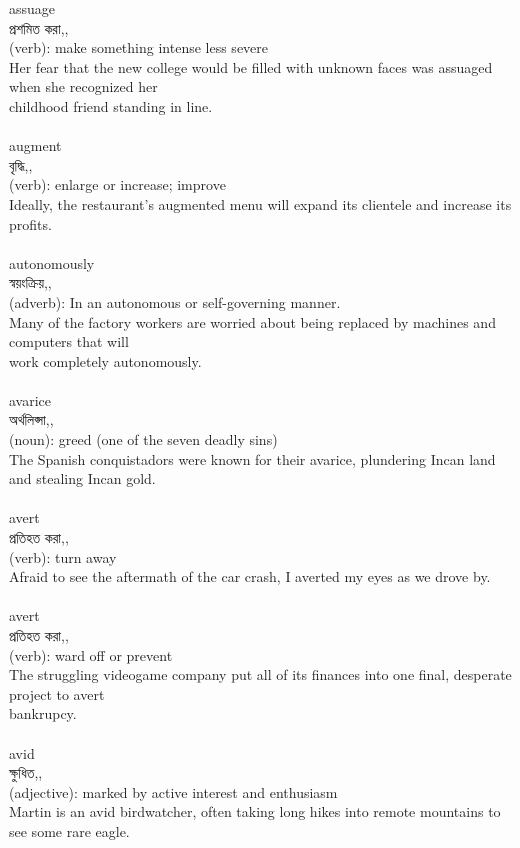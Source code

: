 \documentclass{article}
\begin{document}
{assuage}\\
{প্রশমিত করা,,}\\
{(verb): make something intense less severe\\Her fear that the new college would be filled with unknown faces was assuaged when she recognized her\\childhood friend standing in line.\\}\\
{augment}\\
{বৃদ্ধি,,}\\
{(verb): enlarge or increase; improve\\Ideally, the restaurant's augmented menu will expand its clientele and increase its profits.\\}\\
{autonomously}\\
{স্বয়ংক্রিয়,,}\\
{(adverb): In an autonomous or self-governing manner.\\Many of the factory workers are worried about being replaced by machines and computers that will\\work completely autonomously.\\}\\
{avarice}\\
{অর্থলিপ্সা,,}\\
{(noun): greed (one of the seven deadly sins)\\The Spanish conquistadors were known for their avarice, plundering Incan land and stealing Incan gold.\\}\\
{avert}\\
{প্রতিহত করা,,}\\
{(verb): turn away\\Afraid to see the aftermath of the car crash, I averted my eyes as we drove by.\\}\\
{avert}\\
{প্রতিহত করা,,}\\
{(verb): ward off or prevent\\The struggling videogame company put all of its finances into one final, desperate project to avert\\bankrupcy.\\}\\
{avid}\\
{ক্ষুধিত,,}\\
{(adjective): marked by active interest and enthusiasm\\Martin is an avid birdwatcher, often taking long hikes into remote mountains to see some rare eagle.\\}\\
\end{document}
